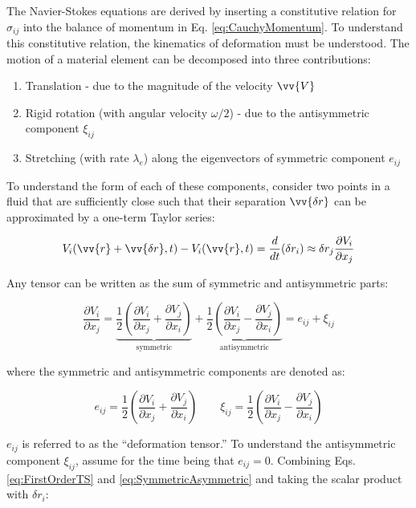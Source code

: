\documentclass[10pt]{article}
\numberwithin{equation}{section} %
\begin{document}
The Navier-Stokes equations are derived by inserting a constitutive relation for \(\sigma_{ij}\) into the balance of momentum in Eq. \eqref{eq:CauchyMomentum}. To understand this constitutive relation, the kinematics of deformation must be understood. The motion of a material element can be decomposed into three contributions:

\begin{enumerate}
\item Translation - due to the magnitude of the velocity \(\vv{V}\)
\item Rigid rotation (with angular velocity \(\omega/2\)) - due to the antisymmetric component \(\xi_{ij}\)
\item Stretching (with rate \(\lambda_e\)) along the eigenvectors of symmetric component \(e_{ij}\)
\end{enumerate}

To understand the form of each of these components, consider two points in a fluid that are sufficiently close such that their separation \(\vv{\delta r}\) can be approximated by a one-term Taylor series:

\begin{equation}
\label{eq:FirstOrderTS}
V_i(\vv{r}+\vv{\delta r}, t)-V_i(\vv{r},t)=\frac{d}{dt}(\delta r_i)\approx\delta r_j\frac{\partial V_i}{\partial x_j}
\end{equation}

Any tensor can be written as the sum of symmetric and antisymmetric parts:

\begin{equation}
\label{eq:VelocitySymmetricAntisymmetric}
\frac{\partial V_i}{\partial x_j}=\underbrace{\frac{1}{2}\left(\frac{\partial V_i}{\partial x_j}+\frac{\partial V_j}{\partial x_i}\right)}_\text{symmetric}+\underbrace{\frac{1}{2}\left(\frac{\partial V_i}{\partial x_j}-\frac{\partial V_j}{\partial x_i}\right)}_\text{antisymmetric}=e_{ij}+\xi_{ij}
\end{equation}

where the symmetric and antisymmetric components are denoted as:

\begin{equation}
\label{eq:SymmetricAsymmetric}
e_{ij}=\frac{1}{2}\left(\frac{\partial V_i}{\partial x_j}+\frac{\partial V_j}{\partial x_i}\right)\quad\quad\xi_{ij}=\frac{1}{2}\left(\frac{\partial V_i}{\partial x_j}-\frac{\partial V_j}{\partial x_i}\right)
\end{equation}

\(e_{ij}\) is referred to as the ``deformation tensor.'' To understand the antisymmetric component \(\xi_{ij}\), assume for the time being that \(e_{ij}=0\). Combining Eqs. \eqref{eq:FirstOrderTS} and \eqref{eq:SymmetricAsymmetric} and taking the scalar product with \(\delta r_i\):
\end{document}
